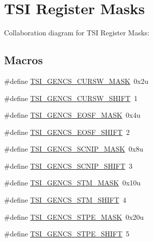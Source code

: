 \hypertarget{group___t_s_i___register___masks}{}\section{T\+SI Register Masks}
\label{group___t_s_i___register___masks}
Collaboration diagram for T\+SI Register Masks\+:
\subsection*{Macros}
\begin{DoxyCompactItemize}
\item 
\#define \hyperlink{group___t_s_i___register___masks_gafd7d98d809a1d17c59cc86addc5fe801}{T\+S\+I\+\_\+\+G\+E\+N\+C\+S\+\_\+\+C\+U\+R\+S\+W\+\_\+\+M\+A\+SK}~0x2u
\item 
\#define \hyperlink{group___t_s_i___register___masks_gadcd854b12f8b747a492eac3e88522b1e}{T\+S\+I\+\_\+\+G\+E\+N\+C\+S\+\_\+\+C\+U\+R\+S\+W\+\_\+\+S\+H\+I\+FT}~1
\item 
\#define \hyperlink{group___t_s_i___register___masks_ga820de7fe1ecba9a42260e304554b389f}{T\+S\+I\+\_\+\+G\+E\+N\+C\+S\+\_\+\+E\+O\+S\+F\+\_\+\+M\+A\+SK}~0x4u
\item 
\#define \hyperlink{group___t_s_i___register___masks_ga9a2e8c68bfb60312ebdeea4f069d9086}{T\+S\+I\+\_\+\+G\+E\+N\+C\+S\+\_\+\+E\+O\+S\+F\+\_\+\+S\+H\+I\+FT}~2
\item 
\#define \hyperlink{group___t_s_i___register___masks_gaf7212a89bc45902f2ed4cee12a1ceb92}{T\+S\+I\+\_\+\+G\+E\+N\+C\+S\+\_\+\+S\+C\+N\+I\+P\+\_\+\+M\+A\+SK}~0x8u
\item 
\#define \hyperlink{group___t_s_i___register___masks_ga372b92d46c9f071d4fdee3edcc0d5219}{T\+S\+I\+\_\+\+G\+E\+N\+C\+S\+\_\+\+S\+C\+N\+I\+P\+\_\+\+S\+H\+I\+FT}~3
\item 
\#define \hyperlink{group___t_s_i___register___masks_ga490fa9afb2591596712216cc7031cd47}{T\+S\+I\+\_\+\+G\+E\+N\+C\+S\+\_\+\+S\+T\+M\+\_\+\+M\+A\+SK}~0x10u
\item 
\#define \hyperlink{group___t_s_i___register___masks_ga4e08b4560fff0d44559e8dd48afcb4b0}{T\+S\+I\+\_\+\+G\+E\+N\+C\+S\+\_\+\+S\+T\+M\+\_\+\+S\+H\+I\+FT}~4
\item 
\#define \hyperlink{group___t_s_i___register___masks_ga83a2e8e8965873c67507422e6e9a9b8e}{T\+S\+I\+\_\+\+G\+E\+N\+C\+S\+\_\+\+S\+T\+P\+E\+\_\+\+M\+A\+SK}~0x20u
\item 
\#define \hyperlink{group___t_s_i___register___masks_gab11b995ab664e22700a2f67aa2b1a070}{T\+S\+I\+\_\+\+G\+E\+N\+C\+S\+\_\+\+S\+T\+P\+E\+\_\+\+S\+H\+I\+FT}~5

\end{DoxyCompactItemize}
